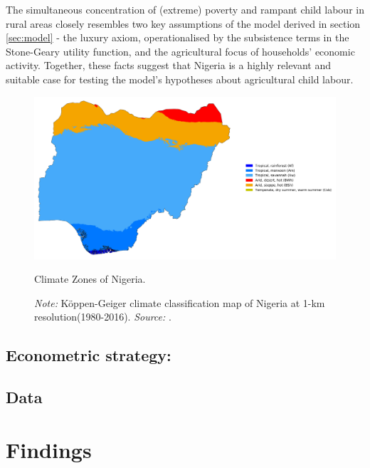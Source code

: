 \documentclass[a4paper,12pt]{article}
\theoremstyle{plain}
\theoremstyle{definition}
\theoremstyle{definition}
\theoremstyle{definition}
\theoremstyle{definition}
\begin{document}
The simultaneous concentration of (extreme) poverty and rampant child labour in rural areas closely resembles two key assumptions of the model derived in section \ref{sec:model} - the luxury axiom, operationalised by the subsistence terms in the Stone-Geary utility function, and the agricultural focus of households' economic activity. Together, these facts suggest that Nigeria is a highly relevant and suitable case for testing the model's hypotheses about agricultural child labour.

\begin{figure}[H]
    \centering
    \includegraphics[scale=0.25]{../outputs/climatezones.png}
    \caption{Climate Zones of Nigeria.}
    \caption*{\footnotesize{\textit{Note:} Köppen-Geiger climate classification map of Nigeria at 1-km resolution(1980-2016). \textit{Source:} \citet{Beck2018}.}}
    \label{fig:climate_zones}
    \end{figure}

    \subsection{Econometric strategy:}
\label{sub:econometric_strategy}
\subsection{Data}
\label{sub:data}

\section{Findings}
\label{sec:findings}

\label{sec:simulation}
\end{document}

